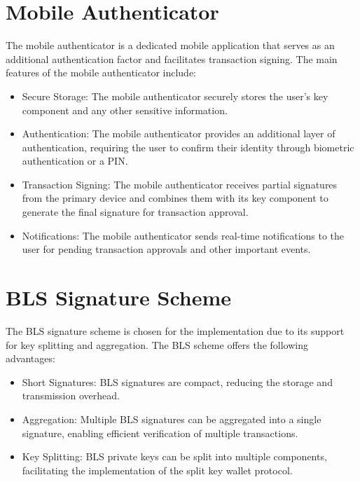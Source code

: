 \section{Mobile Authenticator}
The mobile authenticator is a dedicated mobile application that serves as an additional authentication factor and facilitates transaction signing. The main features of the mobile authenticator include:
\begin{itemize}
\item Secure Storage: The mobile authenticator securely stores the user's key component and any other sensitive information.
\item Authentication: The mobile authenticator provides an additional layer of authentication, requiring the user to confirm their identity through biometric authentication or a PIN.
\item Transaction Signing: The mobile authenticator receives partial signatures from the primary device and combines them with its key component to generate the final signature for transaction approval.
\item Notifications: The mobile authenticator sends real-time notifications to the user for pending transaction approvals and other important events.
\end{itemize}
\section{BLS Signature Scheme}
The BLS signature scheme is chosen for the implementation due to its support for key splitting and aggregation. The BLS scheme offers the following advantages:
\begin{itemize}
\item Short Signatures: BLS signatures are compact, reducing the storage and transmission overhead.
\item Aggregation: Multiple BLS signatures can be aggregated into a single signature, enabling efficient verification of multiple transactions.
\item Key Splitting: BLS private keys can be split into multiple components, facilitating the implementation of the split key wallet protocol.
\end{itemize}
